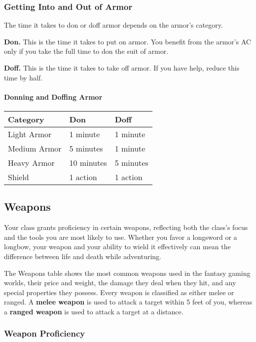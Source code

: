 \documentclass[
]{article}
\begin{document}
\hypertarget{getting-into-and-out-of-armor}{%
\subsubsection{Getting Into and Out of
Armor}\label{getting-into-and-out-of-armor}}

The time it takes to don or doff armor depends on the armor's category.

\textbf{Don.} This is the time it takes to put on armor. You benefit
from the armor's AC only if you take the full time to don the suit of
armor.

\textbf{Doff.} This is the time it takes to take off armor. If you have
help, reduce this time by half.

\hypertarget{donning-and-doffing-armor}{%
\paragraph{Donning and Doffing Armor}\label{donning-and-doffing-armor}}

\begin{longtable}[]{@{}lll@{}}
\toprule
Category & Don & Doff\tabularnewline
\midrule
\endhead
Light Armor & 1 minute & 1 minute\tabularnewline
Medium Armor & 5 minutes & 1 minute\tabularnewline
Heavy Armor & 10 minutes & 5 minutes\tabularnewline
Shield & 1 action & 1 action\tabularnewline
\bottomrule
\end{longtable}

\hypertarget{weapons}{%
\subsection{Weapons}\label{weapons}}

Your class grants proficiency in certain weapons, reflecting both the
class's focus and the tools you are most likely to use. Whether you
favor a longsword or a longbow, your weapon and your ability to wield it
effectively can mean the difference between life and death while
adventuring.

The Weapons table shows the most common weapons used in the fantasy
gaming worlds, their price and weight, the damage they deal when they
hit, and any special properties they possess. Every weapon is classified
as either melee or ranged. A \textbf{melee weapon} is used to attack a
target within 5 feet of you, whereas a \textbf{ranged weapon} is used to
attack a target at a distance.

\hypertarget{weapon-proficiency}{%
\subsubsection{Weapon Proficiency}\label{weapon-proficiency}}
\end{document}
